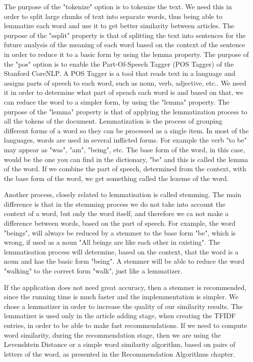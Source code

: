 The purpose of the "tokenize" option is to tokenize the text. We need this in order to split large chunks of text into separate words, thus being able to lemmatize each word and use it to get better similarity between articles.
The purpose of the "ssplit" property is that of splitting the text into sentences for the future analysis of the meaning of each word based on the context of the sentence in order to reduce it to a basic form by using the lemma property.
The purpose of the "pos" option is to enable the Part-Of-Speech Tagger (POS Tagger) of the Stanford CoreNLP. 
A POS Tagger is a tool that reads text in a language and assigns parts of speech to each word, such as noun, verb, adjective, etc..
We need it in order to determine what part of speach each word is and based on that, we can reduce the word to a simpler form, by using the "lemma" property.
The purpose of the "lemma" property is that of applying the lemmatization process to all the tokens of the document.
Lemmatization is the process of grouping different forms of a word so they can be processed as a single item.
In most of the languages, words are used in several inflicted forms. For example the verb "to be" may appear as "was", "am", "being", etc. The base form of the word, in this case, would be the one you can find in the dictionary, "be" and this is called the lemma of the word. If we combine the part of speech, determined from the context,  with the base form of the word, we get something called the lexeme of the word. 

Another process, closely related to lemmatisation is called stemming. The main difference is that in the stemming process we do not take into account the context of a word, but only the word itself, and therefore we ca not make a difference between words, based on the part of speech. For example, the word "beings", will always be reduced by a stemmer to the base form "be", which is wrong, if used as a noun "All beings are like each other in existing". The lemmatisation process will determine, based on the context, that the word is a noun and has the basic form "being". A stemmer will be able to reduce the word "walking" to the correct form "walk", just like a lemmatizer.

If the application does not need great accuracy, then a stemmer is recommended, since the running time is much faster and the implemmentation is simpler.
We chose a lemmatizer in order to increase the quality of our similarity results. The lemmatizer is used only in the article adding stage, when creating the TFIDF entries, in order to be able to make fast recommendations. If we need to compute word similarity, during the recommendation stage, then we are using the Levenshtein Distance or a simple word similarity algorithm, based on pairs of letters of the word, as presented in the Recommendation Algorithms chapter.

